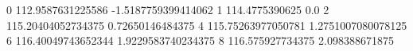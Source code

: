 0 112.9587631225586 -1.5187759399414062
1 114.4775390625 0.0
2 115.20404052734375 0.72650146484375
4 115.75263977050781 1.2751007080078125
6 116.40049743652344 1.9229583740234375
8 116.575927734375 2.098388671875
